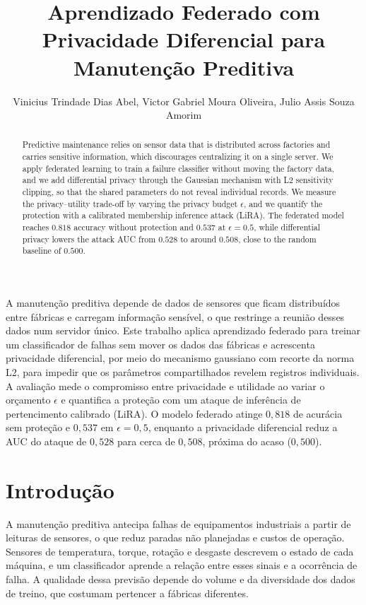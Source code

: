 \documentclass[12pt]{article}
\title{Aprendizado Federado com Privacidade Diferencial para Manutenção Preditiva}
\author{Vinicius Trindade Dias Abel\inst{1}, Victor Gabriel Moura Oliveira\inst{1}, Julio Assis Souza Amorim\inst{1}}
\begin{document}
\maketitle
\pagestyle{myheadings}

\begin{abstract}
Predictive maintenance relies on sensor data that is distributed across factories
and carries sensitive information, which discourages centralizing it on a single
server. We apply federated learning to train a failure classifier without moving
the factory data, and we add differential privacy through the Gaussian mechanism
with L2 sensitivity clipping, so that the shared parameters do not reveal individual
records. We measure the privacy--utility trade-off by varying the privacy budget
$\epsilon$, and we quantify the protection with a calibrated membership inference
attack (LiRA). The federated model reaches $0.818$ accuracy without protection and
$0.537$ at $\epsilon=0.5$, while differential privacy lowers the attack AUC from
$0.528$ to around $0.508$, close to the random baseline of $0.500$.
\end{abstract}

\begin{resumo}
A manutenção preditiva depende de dados de sensores que ficam distribuídos entre
fábricas e carregam informação sensível, o que restringe a reunião desses dados num
servidor único. Este trabalho aplica aprendizado federado para treinar um
classificador de falhas sem mover os dados das fábricas e acrescenta privacidade
diferencial, por meio do mecanismo gaussiano com recorte da norma L2, para impedir
que os parâmetros compartilhados revelem registros individuais. A avaliação mede o
compromisso entre privacidade e utilidade ao variar o orçamento $\epsilon$ e
quantifica a proteção com um ataque de inferência de pertencimento calibrado (LiRA).
O modelo federado atinge $0{,}818$ de acurácia sem proteção e $0{,}537$ em
$\epsilon=0{,}5$, enquanto a privacidade diferencial reduz a AUC do ataque de
$0{,}528$ para cerca de $0{,}508$, próxima do acaso ($0{,}500$).
\end{resumo}

\section{Introdução} \label{sec:intro}

A manutenção preditiva antecipa falhas de equipamentos industriais a partir de
leituras de sensores, o que reduz paradas não planejadas e custos de operação.
Sensores de temperatura, torque, rotação e desgaste descrevem o estado de cada
máquina, e um classificador aprende a relação entre esses sinais e a ocorrência de
falha. A qualidade dessa previsão depende do volume e da diversidade dos dados de
treino, que costumam pertencer a fábricas diferentes.
\end{document}
